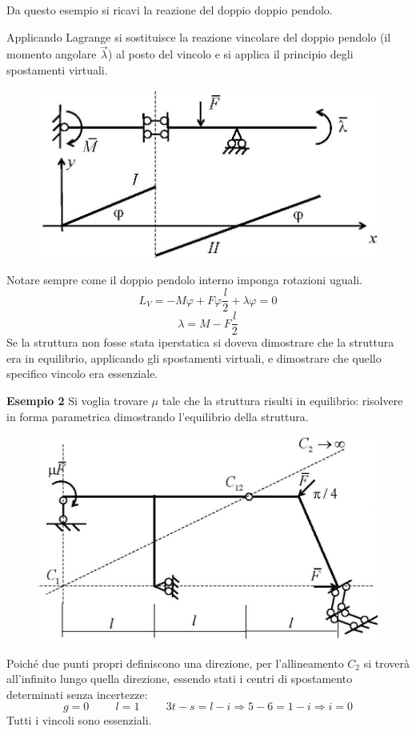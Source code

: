 \documentclass{article}
\begin{document}
\begin{adjustwidth}{2in}{}
Da questo esempio si ricavi la reazione del doppio doppio pendolo.

Applicando Lagrange si sostituisce la reazione vincolare del doppio pendolo (il momento angolare $\vec{\lambda}$) al posto del vincolo e si applica il principio degli spostamenti virtuali. 
 \begin{figure}[H]
	\centering
	\includegraphics[width=0.4\linewidth]{immagini/1.PARTE4_Pagina_19}
\end{figure} 
Notare sempre come il doppio pendolo interno imponga rotazioni uguali.
 \[
 L_V = -M \varphi + F\varphi \frac{l}{2} + \lambda \varphi = 0
 \]
 \[
 \lambda = M - F\frac{l}{2}
 \]
 Se la struttura non fosse stata iperstatica si doveva dimostrare che la struttura era in equilibrio, applicando gli spostamenti virtuali, e dimostrare che quello specifico vincolo era essenziale. \newline \newpage
 
 \textbf{Esempio 2} \newline 
 Si voglia trovare $\mu$ tale che la struttura risulti in equilibrio: risolvere in forma parametrica dimostrando l'equilibrio della struttura. \newline 
 
  \begin{figure}[H]
 	\centering
 	\includegraphics[width=0.4\linewidth]{immagini/1.PARTE4_Pagina_20}
 \end{figure}
 
 Poiché due punti propri definiscono una direzione, per l'allineamento $C_2$ si troverà all'infinito lungo quella direzione, essendo stati i centri di spostamento determinati senza incertezze:
 \[ g = 0 \hspace{1cm} l = 1 \hspace{1cm} 3t - s = l - i \Rightarrow 5-6 = 1-i \Rightarrow i = 0\]
 Tutti i vincoli sono essenziali. \newline 
 

\end{adjustwidth}
\end{document}
